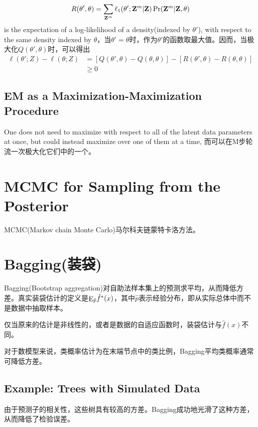             \begin{equation}
                R(\theta ',\theta ) = \sum\limits_{{{\bf{Z}}^m}} {{\ell _1}(\theta ';{{\bf{Z}}^m}|{\bf{Z}})} \Pr ({{\bf{Z}}^m}|{\bf{Z}},\theta )
            \end{equation}
            is the expectation of a log-likelihood of a density(indexed by ${\theta '}$), with respect to the same density indexed by $\theta$，当$\theta ' = \theta$时，作为${\theta '}$的函数取最大值。因而，当极大化$Q(\theta ',\theta )$时，可以得出
            \begin{equation}
              \begin{aligned}
                \ell (\theta ';Z) - \ell (\theta ;Z) &= [Q(\theta ',\theta ) - Q(\theta ,\theta )] - [R(\theta ',\theta ) - R(\theta ,\theta )]\\
                &\ge 0
              \end{aligned}
            \end{equation}
        \subsection{EM as a Maximization-Maximization Procedure}
            One does not need to maximize with respect to all of the latent data parameters at once, but could instead maximize over one of them at a time, 而可以在M步轮流一次极大化它们中的一个。
    \section{MCMC for Sampling from the Posterior}
        MCMC(Markov chain Monte Carlo)马尔科夫链蒙特卡洛方法。
    \section{Bagging(装袋)}
        Bagging(Bootstrap aggregation)对自助法样本集上的预测求平均，从而降低方差。真实装袋估计的定义是${{\mathop{\rm E}\nolimits} _{\hat p}}{\hat f^*}(x)$，其中$\hat p$表示经验分布，即从实际总体中而不是数据中抽取样本。
        
        仅当原来的估计是非线性的，或者是数据的自适应函数时，装袋估计与${\hat f}(x)$不同。
    
        对于数模型来说，类概率估计为在末端节点中的类比例，Bagging平均类概率通常可降低方差。
        \subsection{Example: Trees with Simulated Data}
            由于预测子的相关性，这些树具有较高的方差。Bagging成功地光滑了这种方差，从而降低了检验误差。
            
